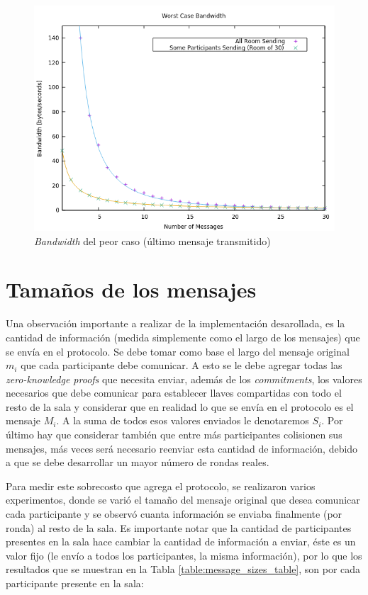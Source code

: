 \begin{figure}[H]
  \centering
    \includegraphics[scale=0.7]{logs/bandwidth.png}
  \caption{\emph{Bandwidth} del peor caso (último mensaje transmitido)}
  \label{fig:times-variable}
\end{figure}

\section{Tamaños de los mensajes}

Una observación importante a realizar de la implementación desarollada, es la 
cantidad de información (medida simplemente como el largo de los mensajes) que 
se envía en el protocolo. Se debe tomar como base el largo del mensaje 
original $m_i$ que cada participante debe comunicar. A esto se le debe agregar 
todas las \emph{zero-knowledge proofs} que necesita enviar, además de los 
\emph{commitments}, los valores necesarios que debe comunicar para establecer 
llaves compartidas con todo el resto de la sala y considerar que en realidad 
lo que se envía en el protocolo es el mensaje $M_i$. A la suma de todos esos 
valores enviados le denotaremos $S_i$. Por último hay que considerar también 
que entre más participantes colisionen sus mensajes, más veces será necesario 
reenviar esta cantidad de información, debido a que se debe desarrollar un 
mayor número de rondas reales.

Para medir este sobrecosto que agrega el protocolo, se realizaron varios 
experimentos, donde se varió el tamaño del mensaje original que desea 
comunicar cada participante y se observó cuanta información se enviaba 
finalmente (por ronda) al resto de la sala. Es importante notar que la 
cantidad de participantes presentes en la sala hace cambiar la cantidad de 
información a enviar, éste es un valor fijo (le envío a todos los 
participantes, la misma información), por lo que los resultados que se 
muestran en la Tabla \ref{table:message_sizes_table}, son por cada 
participante presente en la sala:

